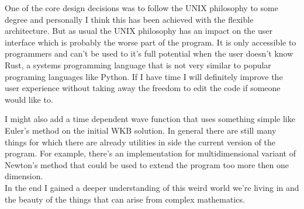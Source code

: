 \documentclass[11pt,DIV=10,final]{scrreprt} %
\begin{document}
One of the core design decisions was to follow the UNIX philosophy to some degree and personally I think this has been achieved with the flexible architecture. But as usual the UNIX philosophy has an
impact on the user interface which is probably the worse part of the program. It is only accessible to programmers and can't be used to it's full potential when the user doesn't know Rust, a systems
programming language that is not very similar to popular programing languages like Python. If I have time I will definitely improve the user experience without taking away the freedom to edit the code if
someone would like to.

I might also add a time dependent wave function that uses something simple like Euler's method on the initial WKB solution. In general there are still many things for which there are already utilities in
side the current version of the program. For example, there's an implementation for multidimensional variant of Newton's method that could be used to extend the program too more then one dimension.
\\[3ex]
In the end I gained a deeper understanding of this weird world we're living in and the beauty of the things that can arise from complex mathematics.
\end{document}
